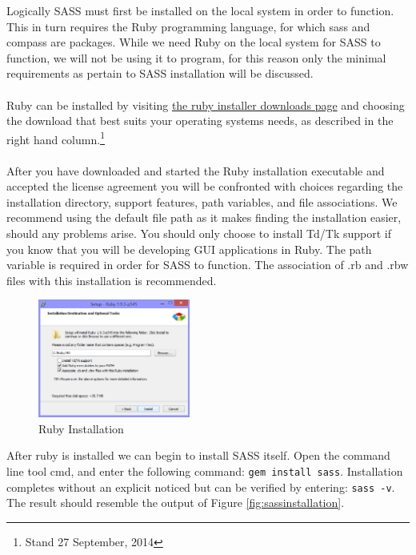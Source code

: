 \documentclass[]{report}
\begin{document}
Logically SASS must first be installed on the local system in order to function. This in turn requires the Ruby programming language, for which sass and compass are packages. While we need Ruby on the local system for SASS to function, we will not be using it to program, for this reason only the minimal requirements as pertain to SASS installation will be discussed.\\
\\
Ruby can be installed by visiting \href{http://www.rubyinstaller.org/downloads/}{the ruby installer downloads page} and choosing the download that best suits your operating systems needs, as described in the right hand column.\footnote{Stand 27 September, 2014}\\
\\
After you have downloaded and started the Ruby installation executable and accepted the license agreement you will be confronted with choices regarding the installation directory, support features, path variables, and file associations. We recommend using the default file path as it makes finding the installation easier, should any problems arise. You should only choose to install Td/Tk support if you know that you will be developing GUI applications in Ruby. The path variable is required in order for SASS to function. The association of .rb and .rbw files with this installation is recommended.

\newpage

\begin{figure}[h] 
	\centering
	\includegraphics[width=5cm]{rubyinstallation.png}
	\caption{Ruby Installation}
	\label{fig:rubyinstallation}
\end{figure}

\noindent
After ruby is installed we can begin to install SASS itself. Open the command line tool cmd, and enter the following command: \texttt{gem install sass}. Installation completes without an explicit noticed but can be verified by entering: \texttt{sass -v}. The result should resemble the output of Figure \ref{fig:sassinstallation}.\\
\end{document}
